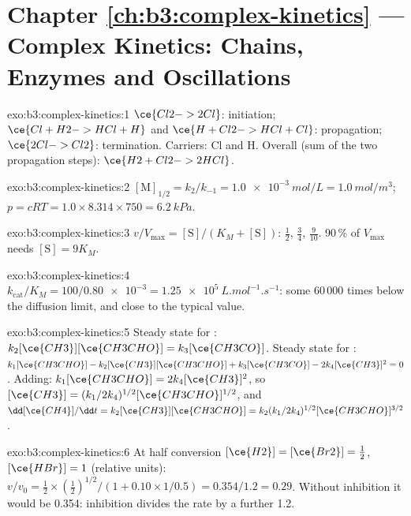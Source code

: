 \section*{Chapter \ref{ch:b3:complex-kinetics} --- Complex Kinetics: Chains, Enzymes and Oscillations}

\begin{solution}{exo:b3:complex-kinetics:1}
$\ce{Cl2 -> 2 Cl}$: initiation; $\ce{Cl + H2 -> HCl + H}$ and $\ce{H + Cl2 -> HCl + Cl}$:
propagation; $\ce{2 Cl -> Cl2}$: termination. Carriers: Cl and H. Overall (sum of the
two propagation steps): $\ce{H2 + Cl2 -> 2 HCl}$.
\end{solution}

\begin{solution}{exo:b3:complex-kinetics:2}
$[\mathrm M]_{1/2} = k_2/k_{-1} = \qty{1.0e-3}{mol/L} = \qty{1.0}{mol/m^3}$; $p = cRT = 1.0 \times 8.314 \times 750 =
\qty{6.2}{kPa}$.
\end{solution}

\begin{solution}{exo:b3:complex-kinetics:3}
$v/V_{\max} = [\mathrm S]/(K_M + [\mathrm S])$: $\frac12$, $\frac34$, $\frac{9}{10}$. 90\,\% of $V_{\max}$ needs $[\mathrm S] = 9K_M$.
\end{solution}

\begin{solution}{exo:b3:complex-kinetics:4}
$k_{\mathrm{cat}}/K_M = 100/\num{0.80e-3} = \qty{1.25e5}{L.mol^{-1}.s^{-1}}$: some 60\,000 times below the diffusion
limit, and close to the typical value.
\end{solution}

\begin{solution}{exo:b3:complex-kinetics:5}
Steady state for : $k_2[\ce{CH3}][\ce{CH3CHO}] = k_3[\ce{CH3CO}]$. Steady state for :
$k_1[\ce{CH3CHO}] - k_2[\ce{CH3}][\ce{CH3CHO}] + k_3[\ce{CH3CO}] - 2k_4[\ce{CH3}]^2 = 0$. Adding: $k_1[\ce{CH3CHO}] =
2k_4[\ce{CH3}]^2$, so $[\ce{CH3}] = (k_1/2k_4)^{1/2}[\ce{CH3CHO}]^{1/2}$, and $\dd[\ce{CH4}]/\dd t = k_2[\ce{CH3}][\ce{CH3CHO}] =
k_2(k_1/2k_4)^{1/2}[\ce{CH3CHO}]^{3/2}$.
\end{solution}

\begin{solution}{exo:b3:complex-kinetics:6}
At half conversion $[\ce{H2}] = [\ce{Br2}] = \frac12$, $[\ce{HBr}] = 1$ (relative units):
$v/v_0 = \frac12 \times (\frac12)^{1/2}/(1 + 0.10 \times 1/0.5) = 0.354/1.2 = 0.29$. Without inhibition it would
be 0.354: inhibition divides the rate by a further 1.2.
\end{solution}

